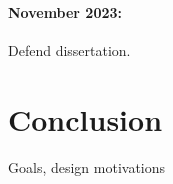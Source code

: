\documentclass [11pt, proquest] {uwthesis}[2020/02/24]
\begin{document}
\subsubsection{November 2023:}
Defend dissertation.


\chapter{Conclusion}

Goals, design motivations

%
%
\nocite{*}   %


%
%
 
 
 
\end{document}
